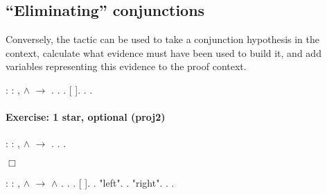 \documentclass[12pt]{report}
\begin{document}
\subsection{``Eliminating'' conjunctions}

 Conversely, the  tactic can be used to take a
    conjunction hypothesis in the context, calculate what evidence
    must have been used to build it, and add variables representing
    this evidence to the proof context. \begin{coqdoccode}
\coqdocemptyline
\coqdocnoindent
{}  : \coqdockw{\ensuremath{\forall}}   : , \coqdoceol
\coqdocindent{1.00em}
 \ensuremath{\land}  \ensuremath{\rightarrow} .\coqdoceol
\coqdocnoindent
{}.\coqdoceol
\coqdocindent{1.00em}
   .\coqdoceol
\coqdocindent{1.00em}
   [ ].\coqdoceol
\coqdocindent{1.00em}
 . .\coqdoceol
\coqdocemptyline
\end{coqdoccode}
\paragraph{Exercise: 1 star, optional (proj2)}

\begin{coqdoccode}
\coqdocnoindent
{}  : \coqdockw{\ensuremath{\forall}}   : , \coqdoceol
\coqdocindent{1.00em}
 \ensuremath{\land}  \ensuremath{\rightarrow} .\coqdoceol
\coqdocnoindent
{}.\coqdoceol
 .\coqdoceol
\end{coqdoccode}
\ensuremath{\Box} \begin{coqdoccode}
\coqdocemptyline
\coqdocnoindent
{}  : \coqdockw{\ensuremath{\forall}}   : , \coqdoceol
\coqdocindent{1.00em}
 \ensuremath{\land}  \ensuremath{\rightarrow}  \ensuremath{\land} .\coqdoceol
\coqdocnoindent
{}.\coqdoceol
\coqdocindent{1.00em}
   .\coqdoceol
\coqdocindent{1.00em}
   [ ].\coqdoceol
\coqdocindent{1.00em}
.\coqdoceol
\coqdocindent{2.00em}
 "left".  .\coqdoceol
\coqdocindent{2.00em}
 "right".  . .\coqdoceol
\coqdocemptyline
\end{coqdoccode}
\end{document}
